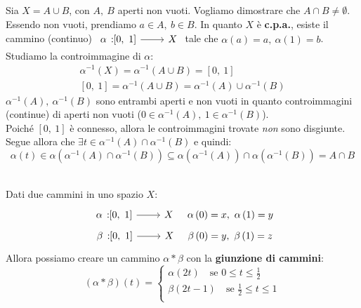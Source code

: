 \begin{demonstration}
	Sia $X=A\cup B$, con $A,\ B$ aperti non vuoti. Vogliamo dimostrare che $A\cap B\neq \emptyset$. Essendo non vuoti, prendiamo $a\in A,\ b\in B$. In quanto $X$ è \textbf{c.p.a.}, esiste il cammino (continuo) $\funz{\alpha}{\left[0,\ 1\right]}{X}$ tale che $\alpha\left(a\right)=a,\ \alpha\left(1\right)=b$.\\
	Studiamo la controimmagine di $\alpha$:
	\begin{gather*}
		\alpha^{-1}\left(X\right)=\alpha^{-1}\left(A\cup B\right)=\left[0,\ 1\right]\\
		\left[0,\ 1\right]=\alpha^{-1}\left(A\cup B\right)=\alpha^{-1}\left(A\right)\cup \alpha^{-1}\left(B\right)
	\end{gather*}
$\alpha^{-1}\left(A\right),\ \alpha^{-1}\left(B\right)$ sono entrambi aperti e non vuoti in quanto controimmagini (continue) di aperti non vuoti ($0\in \alpha^{-1}\left(A\right),\ 1\in \alpha^{-1}\left(B\right)$).\\
Poiché $\left[0,\ 1\right]$ è connesso, allora le controimmagini trovate \textit{non} sono disgiunte. Segue allora che $\exists t\in \alpha^{-1}\left(A\right)\cap \alpha^{-1}\left(B\right)$ e quindi:
\begin{equation*}
\alpha\left(t\right)\in\alpha\left(\alpha^{-1}\left(A\right)\cap \alpha^{-1}\left(B\right)\right)\subseteq\alpha\left(\alpha^{-1}\left(A\right)\right)\cap\alpha\left(\alpha^{-1}\left(B\right)\right)=A\cap B
\end{equation*}
\vspace{-3mm}
\end{demonstration}
\begin{define}~{}\\
	Dati due cammini in uno spazio $X$:
	\begin{gather*}
		\funz{\alpha}{\left[0,\ 1\right]}{X}\quad \alpha\left(0\right)=x,\ \alpha\left(1\right)=y\\
		\funz{\beta}{\left[0,\ 1\right]}{X}\quad \beta\left(0\right)=y,\ \beta\left(1\right)=z
	\end{gather*}
	Allora possiamo creare un cammino $\alpha \ast \beta$ con la \textbf{giunzione di cammini}:
	\begin{equation}
		\left(\alpha\ast\beta\right)\left(t\right)=\begin{cases}
			\alpha\left(2t\right)\quad\text{se }0\leq t\leq \frac{1}{2}\\
			\beta\left(2t-1\right)\quad\text{se }\frac{1}{2}\leq t\leq 1\\	
		\end{cases}
	\end{equation}
\vspace{-6mm}
\end{define}

